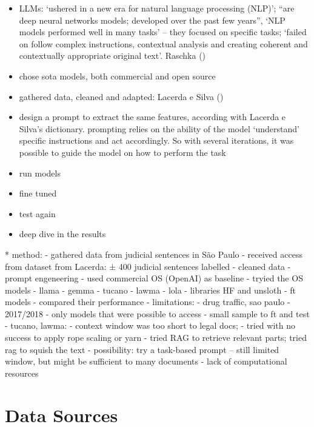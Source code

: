 \documentclass[
  12pt,
  letterpaper,
]{book}
\begin{document}
\begin{itemize}
\begin{figure}[H]
  \end{figure}%
\item
  LLMs: `ushered in a new era for natural language processing (NLP)';
  ``are deep neural networks models; developed over the past few
  years'', `NLP models performed well in many tasks' -- they focused on
  specific tasks; `failed on follow complex instructions, contextual
  analysis and creating coherent and contextually appropriate original
  text'. Raschka ()
\item
  chose sota models, both commercial and open source
\item
  gathered data, cleaned and adapted: Lacerda e Silva
  ()
\item
  design a prompt to extract the same features, according with Lacerda e
  Silva's dictionary. prompting relies on the ability of the model
  `understand' specific instructions and act accordingly. So with
  several iterations, it was possible to guide the model on how to
  perform the task
\item
  run models
\item
  fine tuned
\item
  test again
\item
  deep dive in the results
\end{itemize}

* method: - gathered data from judicial sentences in São Paulo -
received access from dataset from Lacerda: ± 400 judicial sentences
labelled - cleaned data - prompt engeneering - used commercial OS
(OpenAI) as baseline - tryied the OS models - llama - gemma - tucano -
lawma - lola - libraries HF and unsloth - ft models - compared their
performance - limitations: - drug traffic, sao paulo - 2017/2018 - only
models that were possible to access - small sample to ft and test -
tucano, lawma: - context window was too short to legal docs; - tried
with no success to apply rope scaling or yarn - tried RAG to retrieve
relevant parts; tried rag to squish the text - possibility: try a
task-based prompt -- still limited window, but might be sufficient to
many documents - lack of computational resources

\section{Data Sources}\label{data-sources}
\end{document}
